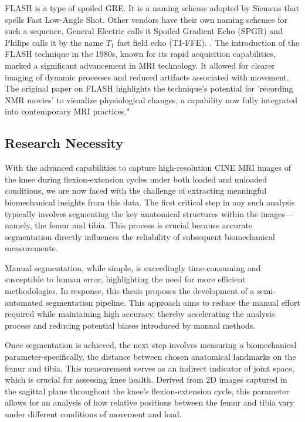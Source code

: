 \documentclass{micro-econ-thesis}
\begin{document}
FLASH is a type of spoiled GRE. It is a naming scheme adopted by Siemens that spells Fast Low-Angle Shot. Other vendors have their own naming schemes for such a sequence. General Electric calls it Spoiled Gradient Echo (SPGR) and Philips calls it by the name $T_1$ fast field echo (T1-FFE). \parencite[p.583]{bernstein_handbook_2004}. The introduction of the FLASH technique in the 1980s, known for its rapid acquisition capabilities, marked a significant advancement in MRI technology. It allowed for clearer imaging of dynamic processes and reduced artifacts associated with movement. The original paper on FLASH highlights the technique's potential for 'recording NMR movies' to visualize physiological changes, a capability now fully integrated into contemporary MRI practices." \parencite{haase_flash_1986}

\subsection{Research Necessity}
With the advanced capabilities to capture high-resolution CINE MRI images of the knee during flexion-extension cycles under both loaded and unloaded conditions, we are now faced with the challenge of extracting meaningful biomechanical insights from this data. The first critical step in any such analysis typically involves segmenting the key anatomical structures within the images—namely, the femur and tibia. This process is crucial because accurate segmentation directly influences the reliability of subsequent biomechanical measurements.

Manual segmentation, while simple, is exceedingly time-consuming and susceptible to human error, highlighting the need for more efficient methodologies. In response, this thesis proposes the development of a semi-automated segmentation pipeline. This approach aims to reduce the manual effort required while maintaining high accuracy, thereby accelerating the analysis process and reducing potential biases introduced by manual methods.

Once segmentation is achieved, the next step involves measuring a biomechanical parameter-specifically, the distance between chosen anatomical landmarks on the femur and tibia. This measurement serves as an indirect indicator of joint space, which is crucial for assessing knee health. Derived from 2D images captured in the sagittal plane throughout the knee's flexion-extension cycle, this parameter allows for an analysis of how relative positions between the femur and tibia vary under different conditions of movement and load.
\end{document}
